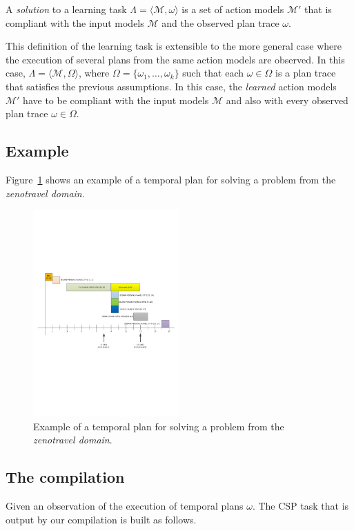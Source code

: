 \documentclass[letterpaper]{article} %
\newcommand{\tup}[1]{{\langle #1 \rangle}}
\begin{document}
A {\em solution} to a learning task $\Lambda=\tup{\mathcal{M},\omega}$ is a set of action models $\mathcal{M}'$ that is compliant with the input models $\mathcal{M}$ and the observed plan trace $\omega$.

This definition of the learning task is extensible to the more general case where the execution of several plans from the same action models are observed. In this case, $\Lambda=\tup{\mathcal{M},\Omega}$, where $\Omega=\{\omega_1,\ldots,\omega_{k}\}$ such that each $\omega\in \Omega$ is a plan trace that satisfies the previous assumptions. In this case, the {\em learned} action models $\mathcal{M}'$ have to be compliant with the input models $\mathcal{M}$ and also with every observed plan trace $\omega\in \Omega$.

\subsection{Example}
Figure~\ref{fig:plan} shows an example of a temporal plan for solving a problem from the {\em zenotravel domain}.

\begin{figure}[hbt!]
        \includegraphics[width=0.5\textwidth]{plan.pdf}
	\caption{Example of a temporal plan for solving a problem from the {\em zenotravel domain}.}
	\label{fig:plan}
\end{figure}

\subsection{The compilation}
Given an observation of the execution of temporal plans $\omega$. The CSP task that is output by our compilation is built as follows.
\end{document}
